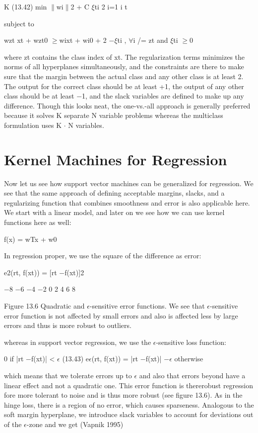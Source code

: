 K (13.42) min $\parallel$wi$\parallel$2 + C $\xi$ti 2 i=1 i t

subject to

wzt xt + wzt0 $\geq$wixt + wi0 + 2 $-$$\xi$ti , $\forall$i /= zt and $\xi$ti $\geq$0

where zt contains the class index of xt. The regularization terms minimizes the norms of all hyperplanes simultaneously, and the constraints are there to make sure that the margin between the actual class and any other class is at least 2. The output for the correct class should be at least +1, the output of any other class should be at least $-$1, and the slack variables are defined to make up any difference. Though this looks neat, the one-vs.-all approach is generally preferred because it solves K separate N variable problems whereas the multiclass formulation uses K $\cdot$ N variables.

\section{Kernel Machines for Regression}

Now let us see how support vector machines can be generalized for regression. We see that the same approach of defining acceptable margins, slacks, and a regularizing function that combines smoothness and error is also applicable here. We start with a linear model, and later on we see how we can use kernel functions here as well:

f(x) = wTx + w0

In regression proper, we use the square of the difference as error:

e2(rt, f(xt)) = [rt $-$f(xt)]2

$-$8 $-$6 $-$4 $-$2 0 2 4 6 8

Figure 13.6 Quadratic and $\epsilon$-sensitive error functions. We see that $\epsilon$-sensitive error function is not affected by small errors and also is affected less by large errors and thus is more robust to outliers.

whereas in support vector regression, we use the $\epsilon$-sensitive loss function:

0 if |rt $-$f(xt)| < $\epsilon$ (13.43) e$\epsilon$(rt, f(xt)) = |rt $-$f(xt)| $-$$\epsilon$ otherwise

which means that we tolerate errors up to $\epsilon$ and also that errors beyond have a linear effect and not a quadratic one. This error function is thererobust regression fore more tolerant to noise and is thus more robust (see figure 13.6). As in the hinge loss, there is a region of no error, which causes sparseness. Analogous to the soft margin hyperplane, we introduce slack variables to account for deviations out of the $\epsilon$-zone and we get (Vapnik 1995)


